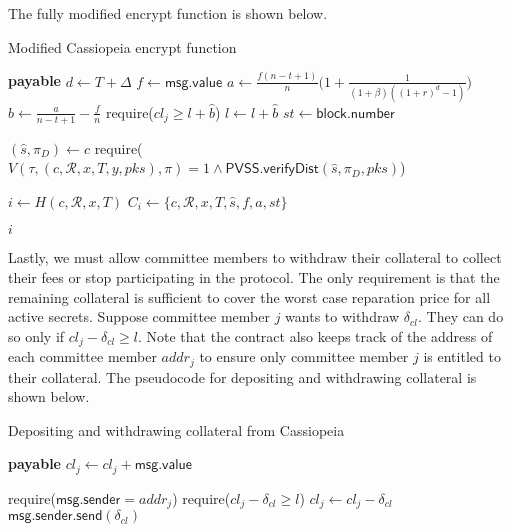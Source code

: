 The fully modified \textsf{encrypt} function is shown below.
\begin{algorithm}[H]
\caption{Modified Cassiopeia \textsf{encrypt} function}
\label{alg:encrypt_incentives}
    \begin{algorithmic}[1]
             \textbf{payable}
                \State $d \gets T + \Delta$
                \State $f \gets \textsf{msg.value}$
                \State $a \gets \frac{f(n - t + 1)}{n}\biggl(1 + \frac{1}{(1 + \beta)((1 + r)^d - 1)}\biggr)$ 
                \State $\hat{b} \gets \frac{a}{n - t + 1} - \frac{f}{n}$ 
                    \State require($cl_j \geq l + \hat{b}$)
                \EndFor
                \State $l \gets l + \hat{b}$
                \State $st \gets \textsf{block.number}$

                \State $(\hat{s}, \pi_D) \gets c$
                \State require($V(\tau, (c, \mathcal{R}, x, T, y, pks), \pi) = 1 \land \textsf{PVSS.verifyDist}(\hat{s}, \pi_D, pks)$)

                \State $i \gets H(c, \mathcal{R}, x, T)$
                \State $C_i \gets \{c, \mathcal{R}, x, T, \hat{s}, f, a, st\}$

                \State \Return $i$
            \EndFunction
    \end{algorithmic}
\end{algorithm}

Lastly, we must allow committee members to withdraw their collateral to collect their fees or stop participating in the protocol.
The only requirement is that the remaining collateral is sufficient to cover the worst case reparation price for all active secrets.
Suppose committee member $j$ wants to withdraw $\delta_{cl}$.
They can do so only if $cl_j - \delta_{cl} \geq l$.
Note that the contract also keeps track of the address of each committee member $addr_j$ to ensure only committee member $j$ is entitled to their collateral.
The pseudocode for depositing and withdrawing collateral is shown below.

\begin{algorithm}[H]
\caption{Depositing and withdrawing collateral from Cassiopeia}
    \begin{algorithmic}[1]
         \textbf{payable}
            \State $cl_j \gets cl_j + \textsf{msg.value}$
        \EndFunction

            \State require($\textsf{msg.sender} = addr_j$)
            \State require($cl_j - \delta_{cl} \geq l$)
            \State $cl_j \gets cl_j - \delta_{cl}$
            \State $\textsf{msg.sender.send}(\delta_{cl})$
        \EndFunction
    \end{algorithmic}
\end{algorithm}

